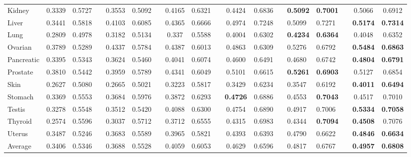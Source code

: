 \documentclass[lettersize,journal]{IEEEtran}
\begin{document}
\begin{table*}[ht]
\begin{tabular}{lcccccccccccclllcc}
Kidney & 0.3339 & 0.5727 &  & 0.3553 & 0.5092 &  & 0.4165 & 0.6321 &  & 0.4424 & 0.6836 &  & \textbf{0.5092} & \textbf{0.7001} &  & 0.5066 & 0.6912 \\
Liver & 0.3441 & 0.5818 &  & 0.4103 & 0.6085 &  & 0.4365 & 0.6666 &  & 0.4974 & 0.7248 &  & 0.5099 & 0.7271 &  & \textbf{0.5174} & \textbf{0.7314} \\
Lung & 0.2809 & 0.4978 &  & 0.3182 & 0.5134 &  & 0.337 & 0.5588 &  & 0.4004 & 0.6302 &  & \textbf{0.4234} & \textbf{0.6364} &  & 0.4048 & 0.6352 \\
Ovarian & 0.3789 & 0.5289 &  & 0.4337 & 0.5784 &  & 0.4387 & 0.6013 &  & 0.4863 & 0.6309 &  & 0.5276 & 0.6792 &  & \textbf{0.5484} & \textbf{0.6863} \\
Pancreatic & 0.3395 & 0.5343 &  & 0.3624 & 0.5460 &  & 0.4041 & 0.6074 &  & 0.4600 & 0.6491 &  & 0.4680 & 0.6742 &  & \textbf{0.4804} & \textbf{0.6791} \\
Prostate & 0.3810 & 0.5442 &  & 0.3959 & 0.5789 &  & 0.4341 & 0.6049 &  & 0.5101 & 0.6615 &  & \textbf{0.5261} & \textbf{0.6903} &  & 0.5127 & 0.6854 \\
Skin & 0.2627 & 0.5080 &  & 0.2665 & 0.5021 &  & 0.3223 & 0.5817 &  & 0.3429 & 0.6234 &  & 0.3547 & 0.6192 &  & \textbf{0.4011} & \textbf{0.6494} \\
Stomach & 0.3369 & 0.5553 &  & 0.3684 & 0.5976 &  & 0.3872 & 0.6293 &  & \textbf{0.4726} & 0.6886 &  & 0.4553 & \textbf{0.7043} &  & 0.4517 & 0.7010 \\
Testis & 0.3278 & 0.5548 &  & 0.3512 & 0.5420 &  & 0.4088 & 0.6300 &  & 0.4754 & 0.6890 &  & 0.4917 & 0.7006 &  & \textbf{0.5334} & \textbf{0.7058} \\
Thyroid & 0.2574 & 0.5596 &  & 0.3037 & 0.5712 &  & 0.3712 & 0.6555 &  & 0.4315 & 0.6983 &  & 0.4344 & \textbf{0.7094} &  & \textbf{0.4508} & 0.7076 \\
Uterus & 0.3487 & 0.5246 &  & 0.3683 & 0.5589 &  & 0.3965 & 0.5821 &  & 0.4393 & 0.6393 &  & 0.4790 & 0.6622 &  & \textbf{0.4846} & \textbf{0.6634} \\ \hline
Average  & 0.3406 & 0.5346 &  & 0.3688 & 0.5528 &  & 0.4059 & 0.6053 &  & 0.4629 & 0.6596 &  & 0.4817 & 0.6767 &  & \textbf{0.4957} & \textbf{0.6808}\\\bottomrule
\end{tabular}
\label{tab:pannuke}
\end{table*}
\end{document}
